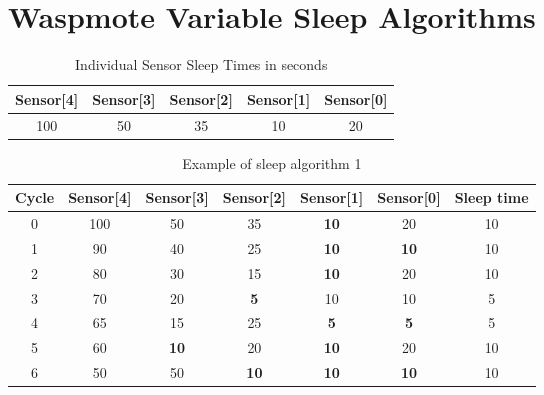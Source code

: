 \newpage

\pagebreak
\clearpage
\section{Waspmote Variable Sleep Algorithms}
\label{AppendixC} %
\begin{table}[!hb]
\begin{center}
\begin{tabular}[!hb]{|c|c|c|c|c|}
\hline
\textbf{Sensor[4]} & \textbf{Sensor[3]} & \textbf{Sensor[2]} & \textbf{Sensor[1]} &\textbf{Sensor[0]}\\
\hline
100  & 50 & 35 & 10 & 20\\
\hline
\end{tabular}
\caption{Individual Sensor Sleep Times in seconds}
\label{tab:sleep1}
\end{center}
\end{table}
\begin{table}[!ht]
\begin{center}
\begin{tabular}[!ht]{|c|c|c|c|c|c|c|}
\hline
\textbf{Cycle} & \textbf{Sensor[4]} & \textbf{Sensor[3]} & \textbf{Sensor[2]} & \textbf{Sensor[1]} &\textbf{Sensor[0]} & \textbf{Sleep time}\\
\hline
0 & 100 & 50 & 35 & \textbf{10} & 20 & 10\\
\hline
1 & 90 & 40 & 25 & \textbf{10} & \textbf{10} & 10\\
\hline
2 & 80 & 30 & 15 & \textbf{10} & 20 & 10\\
\hline
3 & 70 & 20 & \textbf{5} & 10 & 10 & 5\\
\hline
4 & 65 & 15 & 25 & \textbf{5} & \textbf{5} & 5\\
\hline
5 & 60 & \textbf{10} & 20 & \textbf{10} & 20 & 10\\
\hline
6 & 50 & 50 & \textbf{10} & \textbf{10} & \textbf{10} & 10\\
\hline
\end{tabular}
\caption{Example of sleep algorithm 1}
\label{tab:sleep2}
\end{center}
\end{table}
